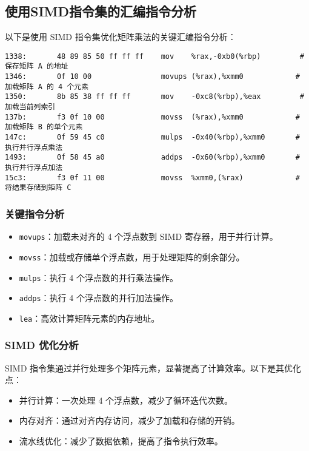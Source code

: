 \documentclass[a4paper,12pt]{ctexart}
\begin{document}
\subsection{使用SIMD指令集的汇编指令分析}
以下是使用 SIMD 指令集优化矩阵乘法的关键汇编指令分析：

\begin{lstlisting}[caption={SIMD 指令集的关键汇编指令}]
1338:       48 89 85 50 ff ff ff    mov    %rax,-0xb0(%rbp)         # 保存矩阵 A 的地址
1346:       0f 10 00                movups (%rax),%xmm0            # 加载矩阵 A 的 4 个元素
1350:       8b 85 38 ff ff ff       mov    -0xc8(%rbp),%eax         # 加载当前列索引
137b:       f3 0f 10 00             movss  (%rax),%xmm0            # 加载矩阵 B 的单个元素
147c:       0f 59 45 c0             mulps  -0x40(%rbp),%xmm0       # 执行并行浮点乘法
1493:       0f 58 45 a0             addps  -0x60(%rbp),%xmm0       # 执行并行浮点加法
15c3:       f3 0f 11 00             movss  %xmm0,(%rax)            # 将结果存储到矩阵 C
\end{lstlisting}

\subsubsection{关键指令分析}
\begin{itemize}
    \item \texttt{movups}：加载未对齐的 4 个浮点数到 SIMD 寄存器，用于并行计算。
    \item \texttt{movss}：加载或存储单个浮点数，用于处理矩阵的剩余部分。
    \item \texttt{mulps}：执行 4 个浮点数的并行乘法操作。
    \item \texttt{addps}：执行 4 个浮点数的并行加法操作。
    \item \texttt{lea}：高效计算矩阵元素的内存地址。
\end{itemize}

\subsubsection{SIMD 优化分析}
SIMD 指令集通过并行处理多个矩阵元素，显著提高了计算效率。以下是其优化点：
\begin{itemize}
    \item 并行计算：一次处理 4 个浮点数，减少了循环迭代次数。
    \item 内存对齐：通过对齐内存访问，减少了加载和存储的开销。
    \item 流水线优化：减少了数据依赖，提高了指令执行效率。
\end{itemize}
\end{document}
